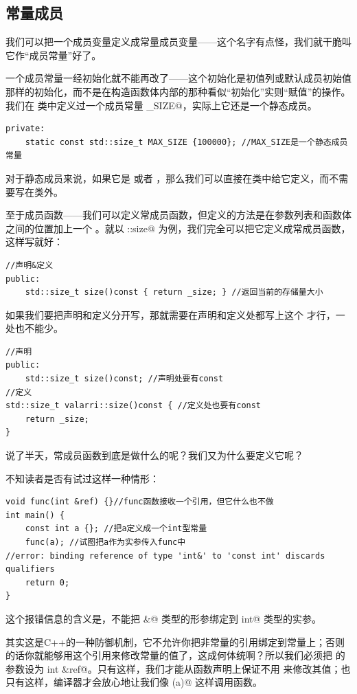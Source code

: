 \subsection*{常量成员}
我们可以把一个成员变量定义成常量成员变量——这个名字有点怪，我们就干脆叫它作``成员常量''好了。\par
一个成员常量一经初始化就不能再改了——这个初始化是初值列或默认成员初始值那样的初始化，而不是在构造函数体内部的那种看似``初始化''实则``赋值''的操作。我们在 \lstinline@valarri@ 类中定义过一个成员常量 \lstinline@MAX_SIZE@，实际上它还是一个静态成员。
\begin{lstlisting}
private:
    static const std::size_t MAX_SIZE {100000}; //MAX_SIZE是一个静态成员常量
\end{lstlisting}
对于静态成员来说，如果它是 \lstinline@const@ 或者 \lstinline@constexpr@，那么我们可以直接在类中给它定义，而不需要写在类外。\par
至于成员函数——我们可以定义常成员函数，但定义的方法是在参数列表和函数体之间的位置加上一个 \lstinline@const@。就以 \lstinline@valarri::size@ 为例，我们完全可以把它定义成常成员函数，这样写就好：
\begin{lstlisting}
//声明&定义
public:
    std::size_t size()const { return _size; } //返回当前的存储量大小
\end{lstlisting}
如果我们要把声明和定义分开写，那就需要在声明和定义处都写上这个 \lstinline@const@ 才行，一处也不能少。
\begin{lstlisting}
//声明
public:
    std::size_t size()const; //声明处要有const
//定义
std::size_t valarri::size()const { //定义处也要有const
    return _size;
}
\end{lstlisting}\par
说了半天，常成员函数到底是做什么的呢？我们又为什么要定义它呢？\par
不知读者是否有试过这样一种情形：
\begin{lstlisting}
void func(int &ref) {}//func函数接收一个引用，但它什么也不做
int main() {
    const int a {}; //把a定义成一个int型常量
    func(a); //试图把a作为实参传入func中
//error: binding reference of type 'int&' to 'const int' discards qualifiers
    return 0;
}
\end{lstlisting}
这个报错信息的含义是，不能把 \lstinline@int&@ 类型的形参绑定到 \lstinline@const int@ 类型的实参。\par
其实这是C++的一种防御机制，它不允许你把非常量的引用绑定到常量上；否则的话你就能够用这个引用来修改常量的值了，这成何体统啊？所以我们必须把 \lstinline@func@ 的参数设为 \lstinline@const int &ref@。只有这样，我们才能从函数声明上保证不用 \lstinline@ref@ 来修改其值；也只有这样，编译器才会放心地让我们像 \lstinline@func(a)@ 这样调用函数。\par
